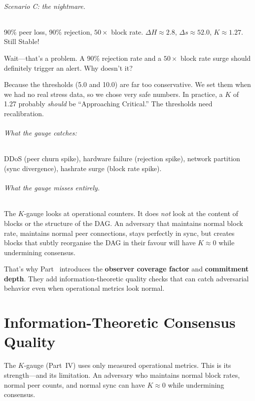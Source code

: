 \documentclass[11pt,a4paper]{article}
\begin{document}
\paragraph{Scenario C: the nightmare.} 90\% peer loss, 90\% rejection, $50\times$ block rate. $\Delta H \approx 2.8$, $\Delta s \approx 52.0$, $K \approx 1.27$. Still Stable!

Wait---that's a problem. A 90\% rejection rate and a $50\times$ block rate surge should definitely trigger an alert. Why doesn't it?

Because the thresholds (5.0 and 10.0) are far too conservative. We set them when we had no real stress data, so we chose very safe numbers. In practice, a $K$ of 1.27 probably \emph{should} be ``Approaching Critical.'' The thresholds need recalibration.

\paragraph{What the gauge catches:} DDoS (peer churn spike), hardware failure (rejection spike), network partition (sync divergence), hashrate surge (block rate spike).

\paragraph{What the gauge misses entirely.} The $K$-gauge looks at operational counters. It does \emph{not} look at the content of blocks or the structure of the DAG. An adversary that maintains normal block rate, maintains normal peer connections, stays perfectly in sync, but creates blocks that subtly reorganise the DAG in their favour will have $K \approx 0$ while undermining consensus.

That's why Part~\ref{part:inftheory} introduces the \textbf{observer coverage factor} and \textbf{commitment depth}. They add information-theoretic quality checks that can catch adversarial behavior even when operational metrics look normal.

\part{Information-Theoretic Consensus Quality}
\label{part:inftheory}

The $K$-gauge (Part~IV) uses only measured operational metrics. This is its strength---and its limitation. An adversary who maintains normal block rates, normal peer counts, and normal sync can have $K \approx 0$ while undermining consensus.
\end{document}
